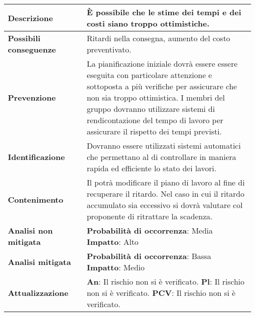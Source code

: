 	\small
	\begin{table}[H]
		\begin{center}			
			\begin{tabular}{p{2.5cm}p{0.5cm}p{11cm}}
				\arrayrulecolor{lightgray}
				
				\toprule				
				\textbf{Descrizione}
				& &
				È possibile che le stime dei tempi e dei costi siano troppo ottimistiche.
				\\
				\midrule
				\textbf{Possibili \newline conseguenze}
				& &
				Ritardi nella consegna, aumento del costo preventivato.
				\\
				\midrule
				\textbf{Prevenzione}
				& &
				La pianificazione iniziale dovrà essere essere eseguita con particolare attenzione e sottoposta a più verifiche per assicurare che non sia troppo ottimistica. I membri del gruppo dovranno utilizzare sistemi di rendicontazione del tempo di lavoro per assicurare il rispetto dei tempi previsti.
				\\
				\midrule
				\textbf{Identificazione}
				& &
				Dovranno essere utilizzati sistemi automatici che permettano al \responsabilediprogetto{} di controllare in maniera rapida ed efficiente lo stato dei lavori.
				\\
				\midrule
				\textbf{Contenimento}
				& &
				Il \responsabilediprogetto{} potrà modificare il piano di lavoro al fine di recuperare il ritardo. Nel caso in cui il ritardo accumulato sia eccessivo si dovrà valutare col proponente di ritrattare la scadenza.
				\\
				\midrule
				\textbf{Analisi \newline non mitigata}
				& &
				\textbf{Probabilità di occorrenza}: Media
				\newline
				\textbf{Impatto}: Alto
				\\
				\midrule
				\textbf{Analisi \newline mitigata}
				& &
				\textbf{Probabilità di occorrenza}: Bassa
				\newline
				\textbf{Impatto}: Medio
				\\
				\midrule
				\textbf{Attualizzazione}
				& &
				\textbf{An}:  Il rischio non si è verificato.
				\newline
				\textbf{Pl}: Il rischio non si è verificato.
				\newline
				\textbf{PCV}: Il rischio non si è verificato.
				\\
				
				\bottomrule	
			\end{tabular}
		\end{center}
	\end{table}			
	
